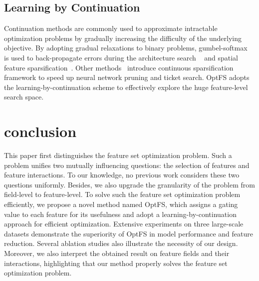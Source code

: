 \documentclass[sigconf]{acmart}
\begin{document}
\vspace{-5pt}

\subsection{Learning by Continuation}
Continuation methods are commonly used to approximate intractable optimization problems by gradually increasing the difficulty of the underlying objective. By adopting gradual relaxations to binary problems, gumbel-softmax~\cite{Gumbel-Softmax} is used to back-propagate errors during the architecture search ~\cite{fbnet} and spatial feature sparsification~\cite{feature_spar}. Other methods~\cite{Cont_Spar, DST, Grow_Spar} introduce continuous sparsification framework to speed up neural network pruning and ticket search.
OptFS adopts the learning-by-continuation scheme to effectively explore the huge feature-level search space.

\vspace{-5pt}
 \section{conclusion}
\label{sec:conclusion}
This paper first distinguishes the feature set optimization problem. Such a problem unifies two mutually influencing questions: the selection of features and feature interactions. To our knowledge, no previous work considers these two questions uniformly. Besides, we also upgrade the granularity of the problem from field-level to feature-level. To solve such the feature set optimization problem efficiently, we propose a novel method named OptFS, which assigns a gating value to each feature for its usefulness and adopt a learning-by-continuation approach for efficient optimization. Extensive experiments on three large-scale datasets demonstrate the superiority of OptFS in model performance and feature reduction. Several ablation studies also illustrate the necessity of our design. Moreover, we also interpret the obtained result on feature fields and their interactions, highlighting that our method properly solves the feature set optimization problem. 
 
\normalem


\end{document}

